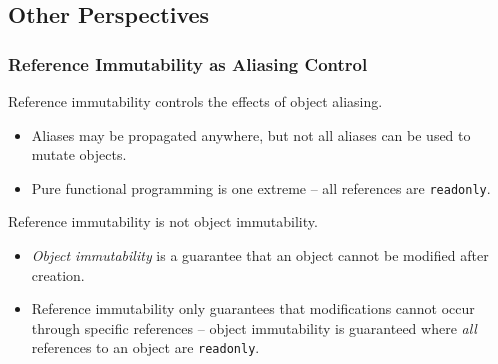 \documentclass{beamer}
\newcommand{\code}[1]{\lstinline$#1$}
\begin{document}


	\subsection{Other Perspectives}

\begin{comment}
\begin{frame}[containsverbatim]
\frametitle{Reference Immutability as an Ownership Type Discipline}
\emph{Ownership types} express patterns
of object \emph{ownership} or \emph{containment}.
\begin{itemize}
\item E.g., a list object may \emph{own} its elements.
\end{itemize}
\hfill\\
\hfill\\
Reference immutability belongs to the \emph{owners-as-modifiers}
discipline.
\begin{itemize}
\item Each object \emph{owns} objects reachable through non-\code{readonly} fields.
\item An object's methods may modify owned objects.
\item Unowned objects may be read, but not modified.
\item Ownership is not confined to a tree structure -- ownership may be cyclical.
\end{itemize}
\end{frame}
\end{comment}

\begin{frame}[containsverbatim]
\frametitle{Reference Immutability as Aliasing Control}
Reference immutability controls the effects of object aliasing.
\begin{itemize}
\item Aliases may be propagated anywhere, but not all aliases can be used to mutate objects.
\item Pure functional programming is one extreme -- all references are \code{readonly}.
\end{itemize}
Reference immutability is not object immutability.
\begin{itemize}
\item \emph{Object immutability} is a guarantee that an object cannot be modified after creation.
\item Reference immutability only guarantees that modifications cannot occur through specific references --
	object immutability is guaranteed where \emph{all} references to an object are \code{readonly}.
\end{itemize}
\end{frame}
\end{document}
